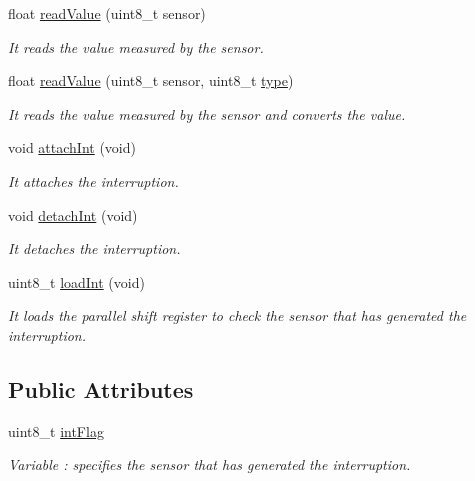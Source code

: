 \begin{DoxyCompactItemize}
float \hyperlink{class_wasp_sensor_event__v20_a60a1b6e08fdd2eb8190212337ea11a10}{read\+Value} (uint8\+\_\+t sensor)
\begin{DoxyCompactList}\small\item\em It reads the value measured by the sensor. \end{DoxyCompactList}\item 
float \hyperlink{class_wasp_sensor_event__v20_a3873a72ece0934479bdf6c0abe1efdfa}{read\+Value} (uint8\+\_\+t sensor, uint8\+\_\+t \hyperlink{_sd_fat_structs_8h_a1d127017fb298b889f4ba24752d08b8e}{type})
\begin{DoxyCompactList}\small\item\em It reads the value measured by the sensor and converts the value. \end{DoxyCompactList}\item 
void \hyperlink{class_wasp_sensor_event__v20_ac8b1497760f35b409f3c1e4fdc2b1eac}{attach\+Int} (void)
\begin{DoxyCompactList}\small\item\em It attaches the interruption. \end{DoxyCompactList}\item 
void \hyperlink{class_wasp_sensor_event__v20_a6353f8ed49e33358a43a626a55c403c1}{detach\+Int} (void)
\begin{DoxyCompactList}\small\item\em It detaches the interruption. \end{DoxyCompactList}\item 
uint8\+\_\+t \hyperlink{class_wasp_sensor_event__v20_a4a0bbca6600156fb49661512ea019e21}{load\+Int} (void)
\begin{DoxyCompactList}\small\item\em It loads the parallel shift register to check the sensor that has generated the interruption. \end{DoxyCompactList}\end{DoxyCompactItemize}
\subsection*{Public Attributes}
\begin{DoxyCompactItemize}
\item 
uint8\+\_\+t \hyperlink{class_wasp_sensor_event__v20_ad0229309369664b9aacc1d4da580db1a}{int\+Flag}
\begin{DoxyCompactList}\small\item\em Variable \+: specifies the sensor that has generated the interruption. \end{DoxyCompactList}\end{DoxyCompactItemize}


